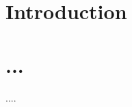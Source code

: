\documentclass[aps,prl,twocolumn,superscriptaddress,floatfix]{revtex4-2}
\begin{document}
\title{}
\author{}
\email{}
\affiliation{}
\affiliation{}

\begin{abstract}
....
\end{abstract}

\maketitle

\section{Introduction}


\section{...}


\begin{acknowledgments}
....
\end{acknowledgments}

 

\end{document}
